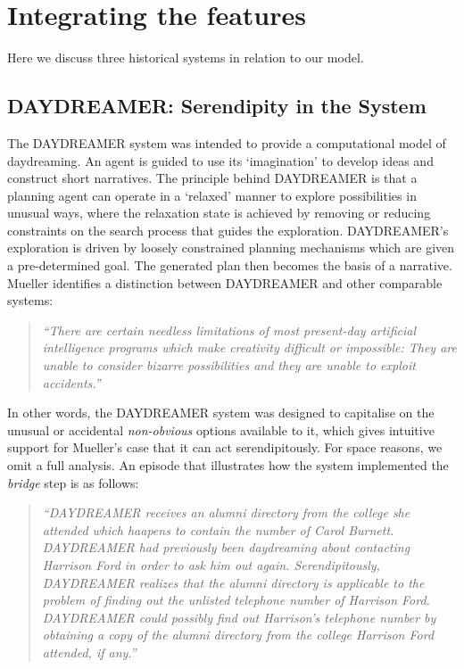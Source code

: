 \section{Integrating the features}\label{sec:system-analysis}

Here we discuss three historical systems in relation to our model. 

\subsection{{\sf DAYDREAMER}: Serendipity in the System}
The {\sf DAYDREAMER} system \cite{mueller1990} was intended to provide a computational model of daydreaming.  An agent is guided to use its `imagination' to develop ideas and construct short narratives.  The principle behind {\sf DAYDREAMER} is that a planning agent can operate in a `relaxed' manner to explore possibilities in unusual ways, where the relaxation state is achieved by removing or reducing constraints on the search process that guides the exploration.  {\sf DAYDREAMER}'s exploration is driven by loosely constrained planning mechanisms which are given a pre-determined goal.
The generated plan then becomes the basis of a narrative.
Mueller identifies a distinction between {\sf DAYDREAMER} and other comparable systems:
\begin{quote}
\emph{``There are certain needless limitations of most present-day
  artificial intelligence programs which make creativity difficult or
  impossible: They are unable to consider bizarre possibilities and
  they are unable to exploit accidents.''} \cite[p. 14]{mueller1990}
\end{quote}
In other words, the {\sf DAYDREAMER} system was designed to capitalise
on the unusual or accidental {\em non-obvious} options available to
it, which gives intuitive support for Mueller's case that it can act
serendipitously.  For space reasons, we omit a full analysis.
An episode that illustrates how the system implemented the \emph{bridge} step is as follows:
\begin{quote}
\emph{``DAYDREAMER receives an alumni directory from the college she attended which haapens to contain the number of Carol Burnett.  DAYDREAMER had previously been daydreaming about contacting Harrison Ford in order to ask him out again.  Serendipitously, DAYDREAMER realizes that the alumni directory is applicable to the problem of finding out the unlisted telephone number of Harrison Ford.  DAYDREAMER could possibly find out Harrison's telephone number by obtaining a copy of the alumni directory from the college Harrison Ford attended, if any.''} \cite[p. 125]{mueller1990}
\end{quote}

